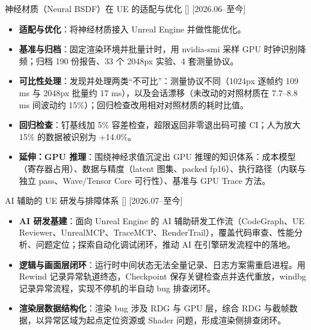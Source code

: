 \documentclass{resume}
\begin{document}
\ResumeItem
{神经材质（Neural BSDF）在 UE 的适配与优化} %
[]
[2026.06--至今]
\begin{itemize}
\item \textbf{适配与优化}：将神经材质接入 Unreal Engine 并做性能优化。
\item \textbf{基准与归档}：固定渲染环境并批量计时，用 nvidia-smi 采样 GPU 时钟识别降频；归档 190 份报告、33 个 2048px 实验、4 套测量协议。
\item \textbf{可比性处理}：发现并处理两类“不可比”：测量协议不同（1024px 逐帧约 109 ms 与 2048px 批量约 17 ms），以及会话漂移（未改动的对照材质在 7.7--8.8 ms 间波动约 15\%）；回归检查改用相对对照材质的耗时比值。
\item \textbf{回归检查}：钉基线加 5\% 容差检查，超限返回非零退出码可接 CI；人为放大 15\% 的数据被识别为 +14.0\%。
\item \textbf{延伸：GPU 推理}：围绕神经求值沉淀出 GPU 推理的知识体系：成本模型（寄存器占用）、数据与精度（latent 图集、packed fp16）、执行路径（内联与独立 pass、Wave/Tensor Core 可行性）、基准与 GPU Trace 方法。
\end{itemize}

\ResumeItem
{AI 辅助的 UE 研发与排障体系} %
[]
[2026.07--至今]
\begin{itemize}
\item \textbf{AI 研发基建}：面向 Unreal Engine 的 AI 辅助研发工作流（CodeGraph、UE Reviewer、UnrealMCP、TraceMCP、RenderTrail），覆盖代码审查、性能分析、问题定位；探索自动化调试闭环，推动 AI 在引擎研发流程中的落地。
\item \textbf{逻辑与画面层闭环}：运行时中间状态无法全量记录、日志方案需重启进程。用 Rewind 记录异常轨道终态，Checkpoint 保存关键检查点并迭代重放，windbg 记录异常流程，实现不停机的半自动 bug 排查闭环。
\item \textbf{渲染层数据结构化}：渲染 bug 涉及 RDG 与 GPU 层，综合 RDG 与截帧数据，以异常区域为起点定位资源或 Shader 问题，形成渲染侧排查闭环。
\end{itemize}

\end{document}
